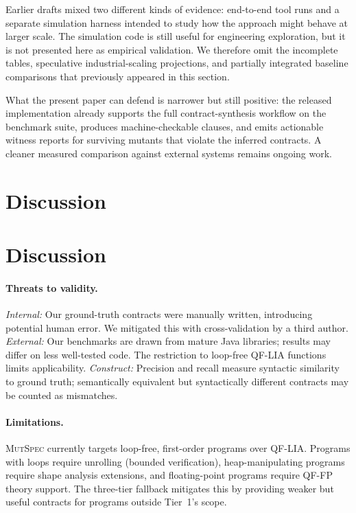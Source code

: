 \documentclass[11pt]{article}
\begin{document}
Earlier drafts mixed two different kinds of evidence: end-to-end tool runs and a separate simulation harness intended to study how the approach might behave at larger scale. The simulation code is still useful for engineering exploration, but it is not presented here as empirical validation. We therefore omit the incomplete tables, speculative industrial-scaling projections, and partially integrated baseline comparisons that previously appeared in this section.

What the present paper can defend is narrower but still positive: the released implementation already supports the full contract-synthesis workflow on the benchmark suite, produces machine-checkable clauses, and emits actionable witness reports for surviving mutants that violate the inferred contracts. A cleaner measured comparison against external systems remains ongoing work.

\section{Discussion}
\section{Discussion}
\label{sec:discussion}

\paragraph{Threats to validity.}
\emph{Internal:} Our ground-truth contracts were manually written, introducing
potential human error. We mitigated this with cross-validation by a third author.
\emph{External:} Our benchmarks are drawn from mature Java libraries; results
may differ on less well-tested code. The restriction to loop-free QF-LIA
functions limits applicability.
\emph{Construct:} Precision and recall measure syntactic similarity to ground
truth; semantically equivalent but syntactically different contracts may be
counted as mismatches.

\paragraph{Limitations.}
\textsc{MutSpec} currently targets loop-free, first-order programs over QF-LIA.
Programs with loops require unrolling (bounded verification), heap-manipulating
programs require shape analysis extensions, and floating-point programs require
QF-FP theory support. The three-tier fallback mitigates this by providing
weaker but useful contracts for programs outside Tier~1's scope.
\end{document}
